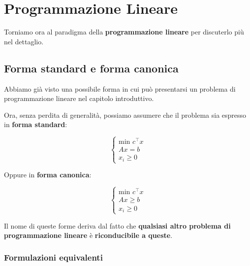 
\chapter{Programmazione Lineare}

Torniamo ora al paradigma della \textbf{programmazione lineare} per
discuterlo più nel dettaglio.

\section{Forma standard e forma canonica}

Abbiamo già visto una possibile forma in cui può presentarsi un problema
di programmazione lineare nel capitolo introduttivo.

Ora, senza perdita di generalità, possiamo assumere che il problema sia espresso 
in \textbf{forma standard}: 

\begin{definition}
    \[
        \begin{cases}
            \text{min } c^\top x \\ 
            Ax = b \\ 
            x_i \ge 0
        \end{cases}
    \] 
\end{definition}

Oppure in \textbf{forma canonica}:

\begin{definition}
    \[
        \begin{cases}
            \text{min } c^\top x \\ 
            Ax \ge  b \\ 
            x_i \ge 0
        \end{cases}
    \] 
\end{definition}

\begin{remark}
    Il nome di queste forme deriva dal fatto che \textbf{qualsiasi altro problema 
    di programmazione lineare} è \textbf{riconducibile a queste}.
\end{remark}

\subsection{Formulazioni equivalenti}

